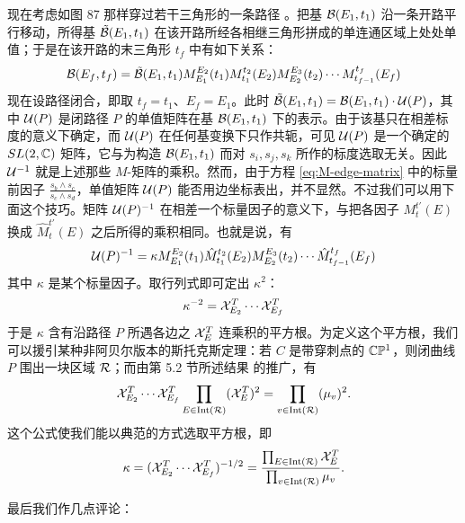 现在考虑如图 87 那样穿过若干三角形的一条路径%
。把基 $\mathcal{B}(E_1,t_1)$ 沿一条开路平行移动，所得基 $\tilde{\mathcal{B}}(E_1,t_1)$ 在该开路所经各相继三角形拼成的单连通区域上处处单值；于是在该开路的末三角形 $t_f$ 中有如下关系：
\begin{equation}
\mathcal{B}(E_f, t_f) =\tilde{\mathcal{B}}(E_1,t_1) M_{E_1}^{E_2}(t_1)
M_{t_1}^{t_2}(E_2) M_{E_2}^{E_3}(t_2) \cdots M_{t_{f-1}}^{t_f}(E_f)
\end{equation}
现在设路径闭合，即取 $t_f=t_1$、$E_f = E_1$。此时 $\tilde{\mathcal{B}}(E_1,t_1) = \mathcal{B}(E_1,t_1) \cdot \mathcal{U}(P)$，其中 $\mathcal{U}(P)$ 是闭路径 $P$ 的单值矩阵在基 $\mathcal{B}(E_1,t_1)$ 下的表示。由于该基只在相差标度的意义下确定，而 $\mathcal{U}(P)$ 在任何基变换下只作共轭，可见 $\mathcal{U}(P)$ 是一个确定的 $SL(2,\mathbb{C})$ 矩阵，它与为构造 $\mathcal{B}(E_1,t_1)$ 而对 $s_i,s_j,s_k$ 所作的标度选取无关。因此 $\mathcal{U}^{-1}$ 就是上述那些 $M$-矩阵的乘积。然而，由于方程 \eqref{eq:M-edge-matrix} 中的标量前因子 $\frac{s_b \wedge s_c}{s_c \wedge s_d}$，单值矩阵 $\mathcal{U}(P)$ 能否用边坐标表出，并不显然。不过我们可以用下面这个技巧。矩阵 $\mathcal{U}(P)^{-1}$ 在相差一个标量因子的意义下，与把各因子 $M_{t}^{t'}(E)$ 换成 $\hat M_{t}^{t'}(E)$ 之后所得的乘积相同。也就是说，有
\begin{equation}
\mathcal{U}(P)^{-1} = \kappa M_{E_1}^{E_2}(t_1) \hat M_{t_1}^{t_2}(E_2)
M_{E_2}^{E_3}(t_2) \cdots \hat M_{t_{f-1}}^{t_f}(E_f)
\end{equation}
其中 $\kappa$ 是某个标量因子。取行列式即可定出 $\kappa^2$：
\begin{equation}
\kappa^{-2}  =   \mathcal{X}_{E_2}^T \cdots \mathcal{X}_{E_f}^T
\end{equation}
于是 $\kappa$ 含有沿路径 $P$ 所遇各边之 $\mathcal{X}_E^T$ 连乘积的平方根。为定义这个平方根，我们可以援引某种非阿贝尔版本的斯托克斯定理：若 $C$ 是带穿刺点的 $\mathbb{C}\mathbb{P}^1$，则闭曲线 $P$ 围出一块区域 $\mathcal{R}$；而由第 5.2 节所述结果%
的推广，有
\begin{equation}
  \mathcal{X}_{E_2}^T \cdots \mathcal{X}_{E_f}^T \prod_{E\in {\rm
Int}(\mathcal{R})} (\mathcal{X}_E^T)^2 = \prod_{v\in {\rm Int}(\mathcal{R})} (\mu_v)^2.
\end{equation}
这个公式使我们能以典范的方式选取平方根，即
\begin{equation}
\kappa = (  \mathcal{X}_{E_2}^T \cdots \mathcal{X}_{E_f}^T)^{-1/2} =
\frac{\prod_{E\in {\rm Int}(\mathcal{R})} \mathcal{X}_E^T}{\prod_{v\in {\rm
Int}(\mathcal{R})} \mu_v}.
\end{equation}

最后我们作几点评论：


